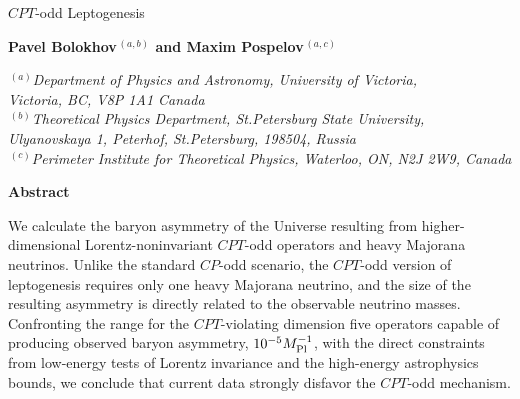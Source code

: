 \documentclass[12pt]{revtex4}
\begin{document}
\begin{titlepage}
\renewcommand{\thefootnote}{\fnsymbol{footnote}}

\setcounter{page}{1}

\vspace*{0.2in}

\begin{center}

\hspace*{-0.6cm}\parbox{17.5cm}{\Large \bf \begin{center}
$CPT$-odd Leptogenesis\end{center}}

\vspace*{0.5cm}
\normalsize


{\bf Pavel Bolokhov$^{\,(a,b)}$ and Maxim Pospelov$^{\,(a,c)}$ }



\smallskip
\medskip

$^{\,(a)}${\it Department of Physics and Astronomy, University of Victoria, \\
     Victoria, BC, V8P 1A1 Canada} \\
$^{\,(b)}${\it Theoretical Physics Department, St.Petersburg State University, Ulyanovskaya 1,
        Peterhof, St.Petersburg, 198504, Russia}\\
$^{\,(c)}${\it Perimeter Institute for Theoretical Physics, Waterloo,
ON, N2J 2W9, Canada}

\smallskip
\end{center}
\vskip0.2in


\centerline{\large\bf Abstract}

We calculate the baryon asymmetry of the Universe resulting from 
higher-dimensional Lorentz-noninvariant $CPT$-odd operators and heavy 
Majorana neutrinos. Unlike the standard $CP$-odd scenario, the $CPT$-odd version of
leptogenesis requires only one heavy Majorana neutrino, and the size of the 
resulting asymmetry is directly related to the observable neutrino masses. 
Confronting the range for the  $CPT$-violating dimension five operators
capable of producing observed baryon asymmetry, $10^{-5}M_{\rm Pl}^{-1}$, 
with the direct constraints from low-energy tests of Lorentz invariance and the high-energy
astrophysics bounds, we conclude that current data strongly disfavor the $CPT$-odd
mechanism.  


\vfil
{}

\end{titlepage}
\end{document}
